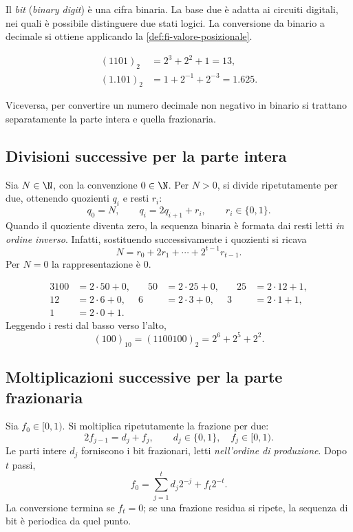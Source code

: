 Il \emph{bit} (\emph{binary digit}) è una cifra binaria. La base due è
adatta ai circuiti digitali, nei quali è possibile distinguere due stati
logici. La conversione da binario a decimale si ottiene applicando la
\cref{def:fi-valore-posizionale}.

\begin{example}
\begin{align*}
  (1101)_2&=2^3+2^2+1=13,\\
  (1.101)_2&=1+2^{-1}+2^{-3}=1.625.
\end{align*}
\end{example}

Viceversa, per convertire un numero decimale non negativo in binario
si trattano separatamente la parte intera e quella frazionaria.

\subsection{Divisioni successive per la parte intera}

Sia \(N\in\N\), con la convenzione \(0\in\N\). Per \(N>0\), si divide
ripetutamente per due, ottenendo quozienti \(q_i\) e resti \(r_i\):
\[
  q_0=N,\qquad q_i=2q_{i+1}+r_i,
  \qquad r_i\in\{0,1\}.
\]
Quando il quoziente diventa zero, la sequenza binaria è formata dai resti
letti \emph{in ordine inverso}. Infatti, sostituendo successivamente i
quozienti si ricava
\[
  N=r_0+2r_1+\cdots+2^{t-1}r_{t-1}.
\]
Per \(N=0\) la rappresentazione è \(0\).

\begin{example}
\begin{alignat*}{3}
  100&=2\cdot50+0, &\quad 50&=2\cdot25+0, &\quad25&=2\cdot12+1,\\
  12&=2\cdot6+0, & 6&=2\cdot3+0, & 3&=2\cdot1+1,\\
  1&=2\cdot0+1.
\end{alignat*}
Leggendo i resti dal basso verso l'alto,
\[
  (100)_{10}=(1100100)_2=2^6+2^5+2^2.
\]
\end{example}

\subsection{Moltiplicazioni successive per la parte frazionaria}

Sia \(f_0\in[0,1)\). Si moltiplica ripetutamente la frazione per due:
\[
  2f_{j-1}=d_j+f_j,
  \qquad d_j\in\{0,1\},\quad f_j\in[0,1).
\]
Le parti intere \(d_j\) forniscono i bit frazionari, letti
\emph{nell'ordine di produzione}. Dopo \(t\) passi,
\[
  f_0=\sum_{j=1}^{t}d_j2^{-j}+f_t2^{-t}.
\]
La conversione termina se \(f_t=0\); se una frazione residua si ripete,
la sequenza di bit è periodica da quel punto.

